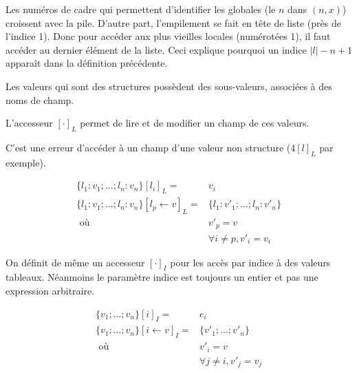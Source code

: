 Les numéros de cadre qui permettent d'identifier les globales (le $n$ dans $(n,
x)$) croissent avec la pile. D'autre part, l'empilement se fait en tête de liste
(près de l'indice 1). Donc pour accéder aux plus vieilles locales (numérotées
1), il faut accéder au dernier élément de la liste. Ceci explique pourquoi un
indice $|l|-n+1$ apparaît dans la définition précédente.

\begin{definition}

  Les valeurs qui sont des structures possèdent des sous-valeurs, associées à
  des noms de champ.

  L'accesseur $[ \cdot ]_L$ permet de lire et de modifier un champ de ces
  valeurs.

  C'est une erreur d'accéder à un champ d'une valeur non structure ($4[l]_L$ par
  exemple).

  \begin{align*}
    \{ l_1 : v_1; … ; l_n : v_n \}[l_i]_L = & v_i \\
    \{ l_1 : v_1; … ; l_n : v_n \}[l_p ← v]_L = & \{ l_1 : v'_1; … ; l_n : v'_n \} \\
          \mbox{ où } & v'_p = v \\
                      & ∀ i ≠ p, v'_i = v_i
  \end{align*}

\end{definition}

\begin{definition}

  On définit de même un accesseur $[\cdot]_I$ pour les accès par indice à des
  valeurs tableaux. Néanmoins le paramètre indice est toujours un entier et pas
  une expression arbitraire.

  \begin{align*}
    \{ v_1 ; … ; v_n \} [i]_I   = & e_i \\
    \{ v_1 ; … ; v_n \} [i←v]_I = & \{ v'_1 ; … ; v'_n \} \\
                      \mbox{ où } & v'_i = v \\
                                  & ∀j≠i, v'_j = v_j
  \end{align*}

\end{definition}

